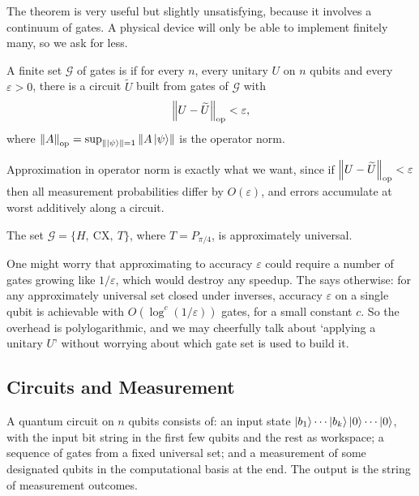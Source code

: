 \documentclass[a4paper]{scrartcl}
\newcommand{\CX}{\mathrm{CX}}
\begin{document}
The theorem is very useful but slightly unsatisfying, because it involves a continuum of gates. A physical device will only be able to implement finitely many, so we ask for less.

\begin{definition}
	A finite set $\mathcal G$ of gates is  if for every $n$, every unitary $U$ on $n$ qubits and every $\varepsilon>0$, there is a circuit $\widetilde U$ built from gates of $\mathcal G$ with
	$$\norm{U - \widetilde U}_{\mathrm{op}} < \varepsilon,$$
	where $\norm{A}_{\mathrm{op}} = \sup_{\norm{\ket{\psi}}=1}\norm{A\ket{\psi}}$ is the operator norm.
\end{definition}

Approximation in operator norm is exactly what we want, since if $\norm{U - \widetilde U}_{\mathrm{op}} < \varepsilon$ then all measurement probabilities differ by $O(\varepsilon)$, and errors accumulate at worst additively along a circuit.

\begin{theorem}
	The set $\mathcal G = \{H,\ \CX,\ T\}$, where $T = P_{\pi/4}$, is approximately universal.
\end{theorem}

\begin{remark}
	One might worry that approximating to accuracy $\varepsilon$ could require a number of gates growing like $1/\varepsilon$, which would destroy any speedup. The  says otherwise: for any approximately universal set closed under inverses, accuracy $\varepsilon$ on a single qubit is achievable with $O(\log^c(1/\varepsilon))$ gates, for a small constant $c$. So the overhead is polylogarithmic, and we may cheerfully talk about `applying a unitary $U$' without worrying about which gate set is used to build it.
\end{remark}

\subsection{Circuits and Measurement}

A quantum circuit on $n$ qubits consists of: an input state $\ket{b_1}\cdots\ket{b_k}\ket{0}\cdots\ket{0}$, with the input bit string in the first few qubits and the rest as workspace; a sequence of gates from a fixed universal set; and a measurement of some designated qubits in the computational basis at the end. The output is the string of measurement outcomes.
\end{document}
